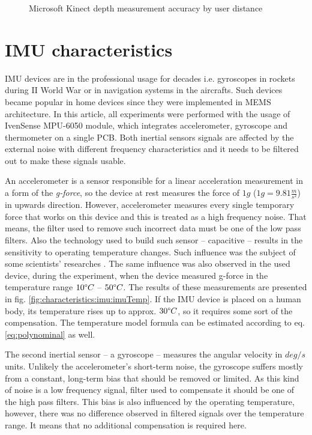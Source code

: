 \documentclass{llncs}
\begin{document}
\pgfplotsset{width=8cm,compat=1.8}
		
\begin{figure}[h!] %
	\centering
	\vspace{2.5cm}	
	\caption{Microsoft Kinect depth measurement accuracy by user distance}
	\label{fig:characteristics:kinect:distanceAccuracy}
\end{figure}
		
\section{IMU characteristics}
IMU devices are in the professional usage for decades i.e. gyroscopes in rockets during II World War or in navigation systems in the aircrafts. Such devices became popular in home devices since they were implemented in MEMS architecture. In this article, all experiments were performed with the usage of IvenSense MPU-6050 module, which integrates accelerometer, gyroscope and thermometer on a single PCB. Both inertial sensors signals are affected by the external noise with different frequency characteristics and it needs to be filtered out to make these signals usable.

An accelerometer is a sensor responsible for a linear acceleration measurement in a form of the \textit{g-force}, so the device at  rest measures the force of $1g$ ($1g = 9.81\frac{m}{s^2}$) in upwards direction. However, accelerometer measures every single temporary force that works on this device and this is treated as a high frequency noise. That means, the filter used to remove such incorrect data must be one of the low pass filters. Also the technology used to build such sensor -- capacitive -- results in the sensitivity to operating temperature changes. Such influence was the subject of some scientists' researches \cite{Gebhardt2006,Grigorie1996}. The same influence was also observed in the used device, during the experiment, when the device measured g-force in the temperature range $10\degree C$ -- $50\degree C$. The results of  these measurements are presented in fig. \ref{fig:characteristics:imu:imuTemp}. If the IMU device is placed on a human body, its temperature rises up to approx. $30\degree C$, so it requires some sort of the compensation. The temperature model formula can be estimated according to eq. \eqref{eq:polynominal} as well.

The second inertial sensor -- a gyroscope -- measures the angular velocity in $deg/s$ units. Unlikely the accelerometer's short-term noise, the gyroscope suffers mostly from a constant, long-term bias that should be removed or limited. As this kind of noise is a low frequency signal, filter used to compensate it should be one of the high pass filters. This bias is also influenced by the operating temperature, however, there was no difference observed in filtered signals over the temperature range. It means that no additional compensation is required here.
 
\end{document}
